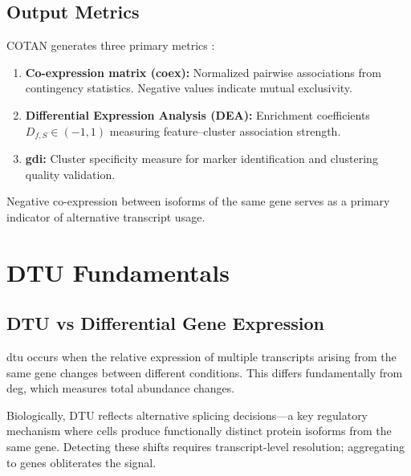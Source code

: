 \subsection{Output Metrics}
COTAN generates three primary metrics \cite{galfre2021cotan}:
\begin{enumerate}
    \item \textbf{Co-expression matrix (coex):} Normalized pairwise associations from contingency statistics. Negative values indicate mutual exclusivity.
    
    \item \textbf{Differential Expression Analysis (DEA):} Enrichment coefficients $D_{f,S} \in (-1, 1)$ measuring feature--cluster association strength.
    
    \item \textbf{\gls{gdi}:} Cluster specificity measure for marker identification and clustering quality validation.
\end{enumerate}

Negative co-expression between isoforms of the same gene serves as a primary indicator of alternative transcript usage.


\section{DTU Fundamentals}

\subsection{DTU vs Differential Gene Expression}
\gls{dtu} occurs when the relative expression of multiple transcripts arising from the same gene changes between different conditions. This differs fundamentally from \gls{deg}, which measures total abundance changes.

Biologically, DTU reflects alternative splicing decisions—a key regulatory mechanism where cells produce functionally distinct protein isoforms from the same gene. Detecting these shifts requires transcript-level resolution; aggregating to genes obliterates the signal.

